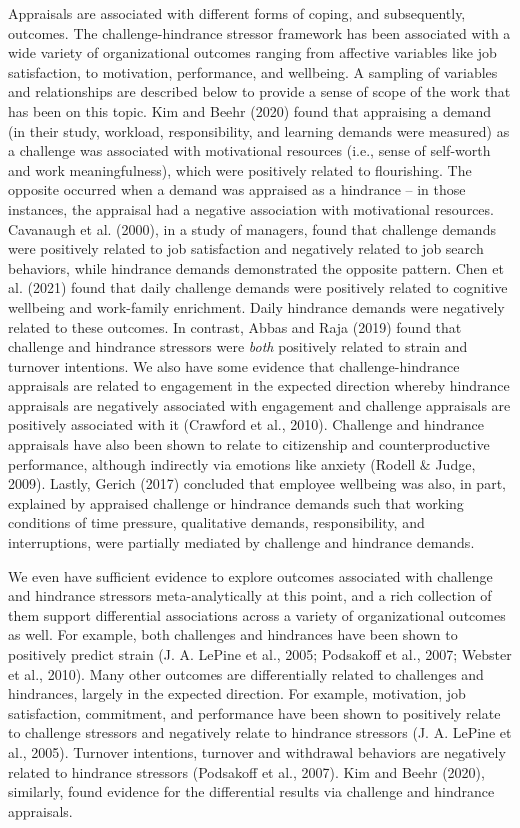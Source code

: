 \documentclass[
  english,
  man]{apa6}
\begin{document}
Appraisals are associated with different forms of coping, and subsequently, outcomes. The challenge-hindrance stressor framework has been associated with a wide variety of organizational outcomes ranging from affective variables like job satisfaction, to motivation, performance, and wellbeing. A sampling of variables and relationships are described below to provide a sense of scope of the work that has been on this topic. Kim and Beehr (2020) found that appraising a demand (in their study, workload, responsibility, and learning demands were measured) as a challenge was associated with motivational resources (i.e., sense of self-worth and work meaningfulness), which were positively related to flourishing. The opposite occurred when a demand was appraised as a hindrance -- in those instances, the appraisal had a negative association with motivational resources. Cavanaugh et al. (2000), in a study of managers, found that challenge demands were positively related to job satisfaction and negatively related to job search behaviors, while hindrance demands demonstrated the opposite pattern. Chen et al. (2021) found that daily challenge demands were positively related to cognitive wellbeing and work-family enrichment. Daily hindrance demands were negatively related to these outcomes. In contrast, Abbas and Raja (2019) found that challenge and hindrance stressors were \emph{both} positively related to strain and turnover intentions. We also have some evidence that challenge-hindrance appraisals are related to engagement in the expected direction whereby hindrance appraisals are negatively associated with engagement and challenge appraisals are positively associated with it (Crawford et al., 2010). Challenge and hindrance appraisals have also been shown to relate to citizenship and counterproductive performance, although indirectly via emotions like anxiety (Rodell \& Judge, 2009). Lastly, Gerich (2017) concluded that employee wellbeing was also, in part, explained by appraised challenge or hindrance demands such that working conditions of time pressure, qualitative demands, responsibility, and interruptions, were partially mediated by challenge and hindrance demands.

We even have sufficient evidence to explore outcomes associated with challenge and hindrance stressors meta-analytically at this point, and a rich collection of them support differential associations across a variety of organizational outcomes as well. For example, both challenges and hindrances have been shown to positively predict strain (J. A. LePine et al., 2005; Podsakoff et al., 2007; Webster et al., 2010). Many other outcomes are differentially related to challenges and hindrances, largely in the expected direction. For example, motivation, job satisfaction, commitment, and performance have been shown to positively relate to challenge stressors and negatively relate to hindrance stressors (J. A. LePine et al., 2005). Turnover intentions, turnover and withdrawal behaviors are negatively related to hindrance stressors (Podsakoff et al., 2007). Kim and Beehr (2020), similarly, found evidence for the differential results via challenge and hindrance appraisals.
\end{document}
